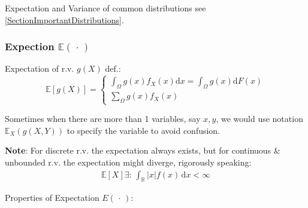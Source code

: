 Expectation and Variance of common distributions see \autoref{SectionImportantDistributions}.

\subsubsection{Expection $ \mathbb{E}(\,\cdot\,) $}
    Expectation of r.v. $g(X)$ def.:
    \begin{equation}
    \mathbb{E} [g(X)]=\begin{cases}
        {\displaystyle\int_\Omega g(x) f_X(x)\mathrm{d}x=\int_\Omega g(x)\mathrm{d}F(x)}\\
        {\displaystyle\sum_{\Omega}g(x)f_X(x)}
    \end{cases}
\end{equation}

    Sometimes when there are more than 1 variables, say $ x,y $, we would use notation $ \mathbb{E}_X\left( g(X,Y) \right)  $ to specify the variable to avoid confusion.

    \textbf{Note}: For discrete r.v. the expectation always exists, but for continuous \& unbounded r.v. the expectation might diverge, rigorously speaking:
    \begin{align}
        \mathbb{E}\left[ X \right]\exists:\, \int_{\mathbb{R}}|x|f(x)\,\mathrm{d}x<\infty  
    \end{align}
    
    
 
\begin{point}
    Properties of Expectation $E(\,\cdot\,)$:
\end{point}

